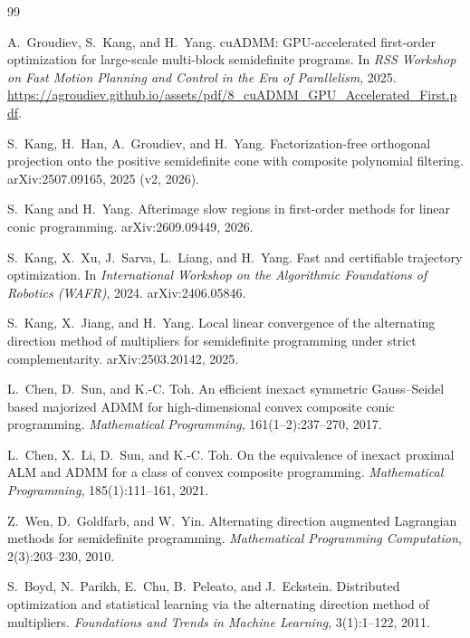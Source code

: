 \documentclass[11pt]{article}
\begin{document}
\begin{thebibliography}{99}

A.~Groudiev, S.~Kang, and H.~Yang.
\newblock cuADMM: GPU-accelerated first-order optimization for large-scale multi-block semidefinite programs.
\newblock In \emph{RSS Workshop on Fast Motion Planning and Control in the Era of Parallelism}, 2025.
\newblock \url{https://agroudiev.github.io/assets/pdf/8_cuADMM_GPU_Accelerated_First.pdf}.

S.~Kang, H.~Han, A.~Groudiev, and H.~Yang.
\newblock Factorization-free orthogonal projection onto the positive semidefinite cone with composite
polynomial filtering.
\newblock arXiv:2507.09165, 2025 (v2, 2026).

S.~Kang and H.~Yang.
\newblock Afterimage slow regions in first-order methods for linear conic programming.
\newblock arXiv:2609.09449, 2026.

S.~Kang, X.~Xu, J.~Sarva, L.~Liang, and H.~Yang.
\newblock Fast and certifiable trajectory optimization.
\newblock In \emph{International Workshop on the Algorithmic Foundations of Robotics (WAFR)}, 2024.
\newblock arXiv:2406.05846.

S.~Kang, X.~Jiang, and H.~Yang.
\newblock Local linear convergence of the alternating direction method of multipliers for semidefinite
programming under strict complementarity.
\newblock arXiv:2503.20142, 2025.

L.~Chen, D.~Sun, and K.-C. Toh.
\newblock An efficient inexact symmetric Gauss--Seidel based majorized ADMM for high-dimensional convex
composite conic programming.
\newblock \emph{Mathematical Programming}, 161(1--2):237--270, 2017.

L.~Chen, X.~Li, D.~Sun, and K.-C. Toh.
\newblock On the equivalence of inexact proximal ALM and ADMM for a class of convex composite programming.
\newblock \emph{Mathematical Programming}, 185(1):111--161, 2021.

Z.~Wen, D.~Goldfarb, and W.~Yin.
\newblock Alternating direction augmented Lagrangian methods for semidefinite programming.
\newblock \emph{Mathematical Programming Computation}, 2(3):203--230, 2010.

S.~Boyd, N.~Parikh, E.~Chu, B.~Peleato, and J.~Eckstein.
\newblock Distributed optimization and statistical learning via the alternating direction method of multipliers.
\newblock \emph{Foundations and Trends in Machine Learning}, 3(1):1--122, 2011.


\end{thebibliography}
\end{document}
